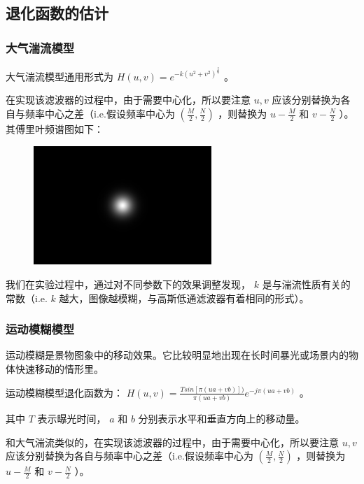 \documentclass[11pt]{ctexart}
\begin{document}
\subsection{退化函数的估计}

\subsubsection{大气湍流模型}

大气湍流模型通用形式为 $H(u,v)=e^{-k(u^2+v^2)^{\frac{5}{6}}}$ 。

在实现该滤波器的过程中，由于需要中心化，所以要注意 $u,v$ 应该分别替换为各自与频率中心之差（i.e.假设频率中心为 $(\frac{M}{2},\frac{N}{2})$ ，则替换为 $u-\frac{M}{2}$ 和 $v-\frac{N}{2}$ ）。其傅里叶频谱图如下：

\begin{figure}[htbp]
    \centering
    \includegraphics[width=0.6\textwidth]{output/turbulence_H.jpg}
\end{figure}

我们在实验过程中，通过对不同参数下的效果调整发现， $k$ 是与湍流性质有关的常数（i.e. $k$ 越大，图像越模糊，与高斯低通滤波器有着相同的形式）。

\subsubsection{运动模糊模型}

运动模糊是景物图象中的移动效果。它比较明显地出现在长时间暴光或场景内的物体快速移动的情形里。

运动模糊模型退化函数为： $H(u,v)=\frac{Tsin[\pi (ua+vb)])}{\pi (ua+vb)}e^{-j\pi (ua+vb)}$ 。

其中 $T$ 表示曝光时间， $a$ 和 $b$ 分别表示水平和垂直方向上的移动量。

和大气湍流类似的，在实现该滤波器的过程中，由于需要中心化，所以要注意 $u,v$ 应该分别替换为各自与频率中心之差（i.e.假设频率中心为 $(\frac{M}{2},\frac{N}{2})$ ，则替换为 $u-\frac{M}{2}$ 和 $v-\frac{N}{2}$ ）。
\end{document}
